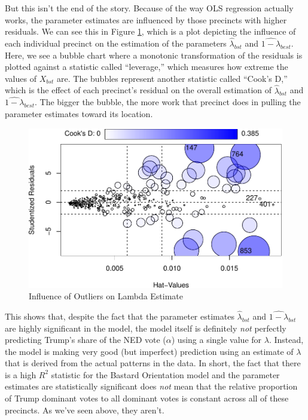 \documentclass[12pt]{article}
\begin{document}
But this isn't the end of the story. Because of the way OLS regression actually works, the parameter estimates are influenced by those precincts with higher residuals. We can see this in Figure \ref{fig:infl}, which is a plot depicting the influence of each individual precinct on the estimation of the parameters \(\hat{\lambda}_{bst}\) and \(\widehat{1-\lambda}_{best}\). Here, we see a bubble chart where a monotonic transformation of the residuals is plotted against a statistic called ``leverage,'' which measures how extreme the values of \(X_{bst}\) are. The bubbles represent another statistic called ``Cook's D,'' which is the effect of each precinct's residual on the overall estimation of \(\hat{\lambda}_{bst}\) and \(\widehat{1-\lambda}_{best}\). The bigger the bubble, the more work that precinct does in pulling the parameter estimates toward its location.

\begin{figure}
\centering
\includegraphics{Report_files/figure-latex/infl-1.pdf}
\caption{\label{fig:infl}Influence of Outliers on Lambda Estimate}
\end{figure}

This shows that, despite the fact that the parameter estimates \(\hat{\lambda}_{bst}\) and \(\widehat{1-\lambda}_{bst}\) are highly significant in the model, the model itself is definitely \emph{not} perfectly predicting Trump's share of the NED vote (\(\alpha\)) using a single value for \(\lambda\). Instead, the model is making very good (but imperfect) prediction using an estimate of \(\lambda\) that is derived from the actual patterns in the data. In short, the fact that there is a high \(R^2\) statistic for the Bastard Orientation model and the parameter estimates are statistically significant does \emph{not} mean that the relative proportion of Trump dominant votes to all dominant votes is constant across all of these precincts. As we've seen above, they aren't.
\end{document}
